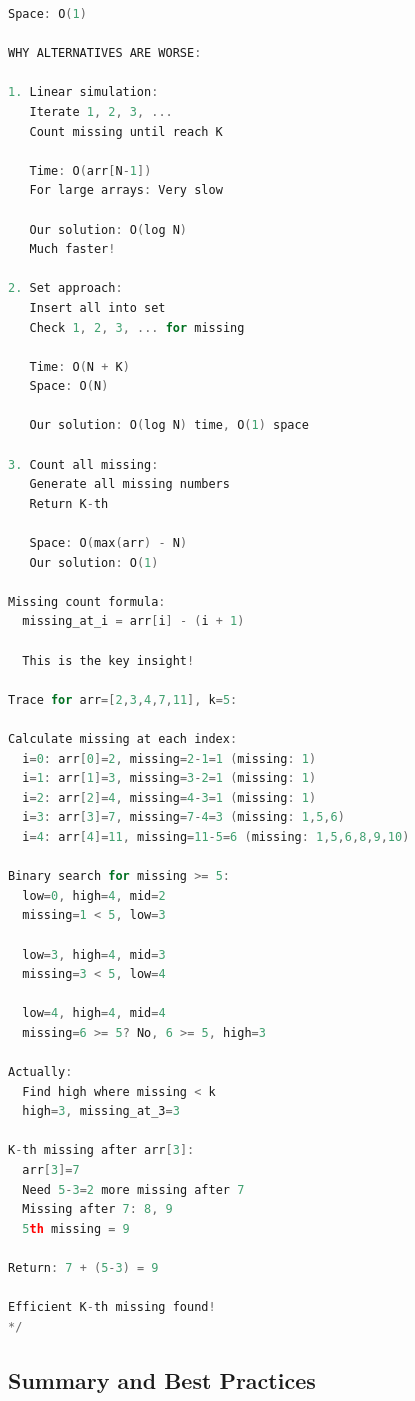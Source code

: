 \documentclass[11pt,a4paper,oneside]{book}
\begin{document}
\begin{lstlisting}[language=C++, caption=Complete Counting Solutions]
Space: O(1)

WHY ALTERNATIVES ARE WORSE:

1. Linear simulation:
   Iterate 1, 2, 3, ...
   Count missing until reach K
   
   Time: O(arr[N-1])
   For large arrays: Very slow
   
   Our solution: O(log N)
   Much faster!

2. Set approach:
   Insert all into set
   Check 1, 2, 3, ... for missing
   
   Time: O(N + K)
   Space: O(N)
   
   Our solution: O(log N) time, O(1) space

3. Count all missing:
   Generate all missing numbers
   Return K-th
   
   Space: O(max(arr) - N)
   Our solution: O(1)

Missing count formula:
  missing_at_i = arr[i] - (i + 1)
  
  This is the key insight!

Trace for arr=[2,3,4,7,11], k=5:

Calculate missing at each index:
  i=0: arr[0]=2, missing=2-1=1 (missing: 1)
  i=1: arr[1]=3, missing=3-2=1 (missing: 1)
  i=2: arr[2]=4, missing=4-3=1 (missing: 1)
  i=3: arr[3]=7, missing=7-4=3 (missing: 1,5,6)
  i=4: arr[4]=11, missing=11-5=6 (missing: 1,5,6,8,9,10)

Binary search for missing >= 5:
  low=0, high=4, mid=2
  missing=1 < 5, low=3
  
  low=3, high=4, mid=3
  missing=3 < 5, low=4
  
  low=4, high=4, mid=4
  missing=6 >= 5? No, 6 >= 5, high=3
  
Actually:
  Find high where missing < k
  high=3, missing_at_3=3

K-th missing after arr[3]:
  arr[3]=7
  Need 5-3=2 more missing after 7
  Missing after 7: 8, 9
  5th missing = 9 

Return: 7 + (5-3) = 9 

Efficient K-th missing found!
*/
\end{lstlisting}

\subsection{Summary and Best Practices}
\end{document}
